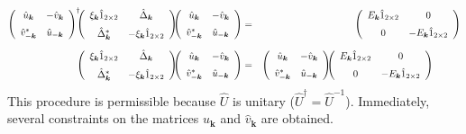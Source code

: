 \documentclass[uplatex,a4j,12pt,dvipdfmx]{jsarticle}
\begin{document}
\begin{eqnarray}
	\left(
	\begin{array}{cc}
		\hat{u}_{\bm{k}}       & - \hat{v}_{\bm{k}} \\[2mm]
		\hat{v}_{- \bm{k}}^{*} & \hat{u}_{-\bm{k}}
	\end{array}
	\right)^{\dagger}
	\!\!\!
	\left(
	\begin{array}{cc}
			\xi_{\bm{k}} \hat{1}_{2 \times 2} & \hat{\Delta}_{\bm{k}}               \\[2mm]
			\hat{\Delta}^{*}_{\bm{k}}         & - \xi_{\bm{k}} \hat{1}_{2 \times 2}
		\end{array}
	\right)
	\!\!\!
	\left(
	\begin{array}{cc}
			\hat{u}_{\bm{k}}       & - \hat{v}_{\bm{k}} \\[2mm]
			\hat{v}_{- \bm{k}}^{*} & \hat{u}_{-\bm{k}}
		\end{array}
	\right)
	&=&
	\left(
	\begin{array}{cc}
			E_{\bm{k}} \hat{1}_{2 \times 2} & 0                                 \\[2mm]
			0                               & - E_{\bm{k}} \hat{1}_{2 \times 2}
		\end{array}
	\right)
	\\[2mm]
	\left(
	\begin{array}{cc}
			\xi_{\bm{k}} \hat{1}_{2 \times 2} & \hat{\Delta}_{\bm{k}}               \\[2mm]
			\hat{\Delta}^{*}_{\bm{k}}         & - \xi_{\bm{k}} \hat{1}_{2 \times 2}
		\end{array}
	\right)
	\!\!\!
	\left(
	\begin{array}{cc}
			\hat{u}_{\bm{k}}       & - \hat{v}_{\bm{k}} \\[2mm]
			\hat{v}_{- \bm{k}}^{*} & \hat{u}_{-\bm{k}}
		\end{array}
	\right)
	&=&
	\left(
	\begin{array}{cc}
			\hat{u}_{\bm{k}}       & - \hat{v}_{\bm{k}} \\[2mm]
			\hat{v}_{- \bm{k}}^{*} & \hat{u}_{-\bm{k}}
		\end{array}
	\right)
	\!\!\!
	\left(
	\begin{array}{cc}
			E_{\bm{k}} \hat{1}_{2 \times 2} & 0                                 \\[2mm]
			0                               & - E_{\bm{k}} \hat{1}_{2 \times 2}
		\end{array}
	\right)
	\hspace{10mm}
\end{eqnarray}
%
This procedure is permissible because $\hat{U}$ is unitary ($\hat{U}^{\dagger} = \hat{U}^{-1}$).
Immediately, several constraints on the matrices $\hat{u}_{\bm{k}}$ and $\hat{v}_{\bm{k}}$ are obtained.
\end{document}
